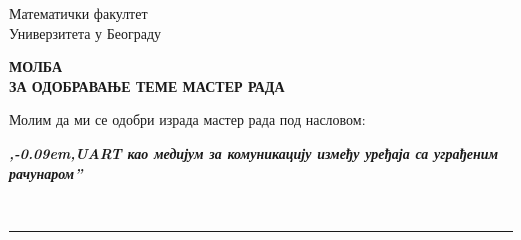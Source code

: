 \documentclass[a4paper]{article}
\def\zn{,\kern-0.09em,}
\begin{document}
\thispagestyle{empty}

\begin{flushleft}
Математички факултет\\
Универзитета у Београду
\end{flushleft}

\bigskip

\begin{center}
\textbf{МОЛБА\\
ЗА ОДОБРАВАЊЕ ТЕМЕ МАСТЕР РАДА
}\end{center}

\bigskip

\begin{flushleft}
Молим да ми се одобри израда мастер рада под насловом:
\end{flushleft}

\begin{minipage}{16.5cm}
\textbf{\textit{\zn UART као медијум за комуникацију између уређаја са уграђеним рачунаром''}}
\end{minipage}\\
\rule[4mm]{17.5cm}{.05mm}
\end{document}
